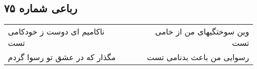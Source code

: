 \begin{center}
\section*{رباعی شماره ۷۵}
\label{sec:sh075}
\begin{longtable}{l p{0.5cm} r}
ناکامیم ای دوست ز خودکامی تست
&&
وین سوختگیهای من از خامی تست
\\
مگذار که در عشق تو رسوا گردم
&&
رسوایی من باعث بدنامی تست
\\
\end{longtable}
\end{center}
